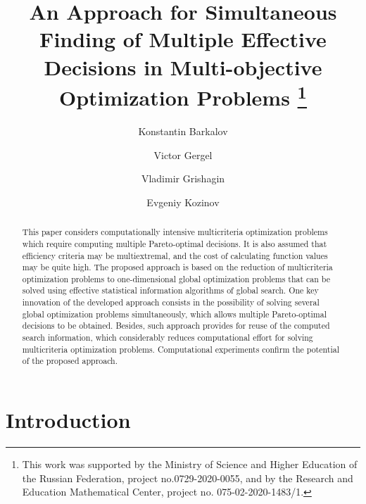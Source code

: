 \documentclass[runningheads]{llncs}
\begin{document}
%
\title{An Approach for Simultaneous Finding of Multiple Effective Decisions in Multi-objective Optimization Problems
\thanks{This work was supported by the Ministry of Science and Higher Education of the Russian Federation, project no.0729-2020-0055, and by the Research and Education Mathematical Center, project no. 075-02-2020-1483/1.}}
%
%
\author{Konstantin Barkalov \and
Victor Gergel \and
Vladimir Grishagin \and
Evgeniy Kozinov 
}
%
%
%
\maketitle              %
%
\begin{abstract}
This paper considers computationally intensive multicriteria optimization problems which require computing multiple Pareto-optimal decisions. It is also assumed that efficiency criteria may be multiextremal, and the cost of calculating function values may be quite high. The proposed approach is based on the reduction of multicriteria optimization problems to one-dimensional global optimization problems that can be solved using effective statistical information algorithms of global search. One key innovation of the developed approach consists in the possibility of solving several global optimization problems simultaneously, which allows multiple Pareto-optimal decisions to be obtained. Besides, such approach provides for reuse of the computed search information, which considerably reduces computational effort for solving multicriteria optimization problems. Computational experiments confirm the potential of the proposed approach.

\end{abstract}
%
%
%
\section{Introduction} \label{sec:01}
\end{document}
